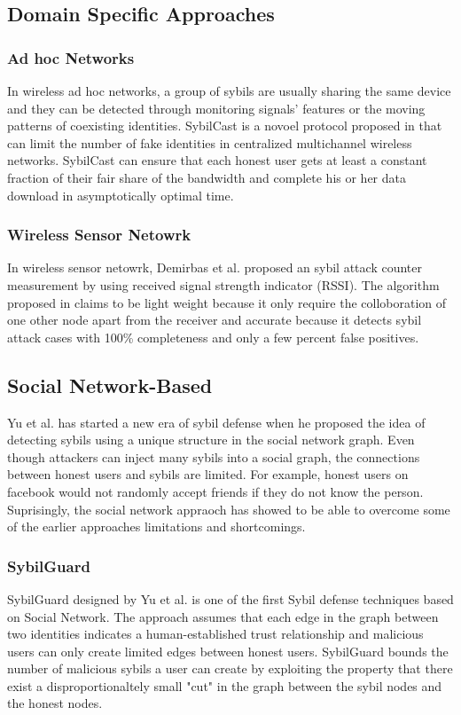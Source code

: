 \documentclass[conference]{IEEEtran}
\begin{document}
\subsection{Domain Specific Approaches}
\subsubsection{Ad hoc Networks}

In wireless ad hoc networks, a group of sybils are usually sharing the same device and they can be detected through monitoring signals’ features or the moving patterns of coexisting identities. SybilCast is a novoel protocol proposed in \cite{Zheng_thwartingsybil} that can limit the number of 
fake identities in centralized multichannel wireless networks. SybilCast can ensure that each honest user gets at least a constant fraction of their fair share of the bandwidth and complete his or her data download in asymptotically optimal time.

\subsubsection{Wireless Sensor Netowrk}
In wireless sensor netowrk, Demirbas et al. proposed an sybil attack counter measurement by using received signal strength indicator (RSSI). The algorithm proposed in \cite{Demirbas06RSSI} claims to be light weight because it only require the colloboration of one other node apart from the receiver and accurate because it detects sybil attack cases with 100\% completeness and only a few percent false positives.
\cite{Demirbas06RSSI}

\subsection{Social Network-Based}
Yu et al. has started a new era of sybil defense when he proposed the idea of detecting sybils using a unique structure in the social network graph. Even though attackers can inject many sybils into a social graph, the connections between honest users and sybils are limited\cite{Yu08SybilGuard}. For example, honest users on facebook would not randomly accept friends if they do not know the person. Suprisingly, the social network appraoch has showed to be able to overcome some of the earlier approaches limitations and shortcomings.

\subsubsection{SybilGuard}
SybilGuard designed by Yu et al. \cite{Yu08SybilGuard} is one of the first Sybil defense techniques based on Social Network. The approach assumes that each edge in the graph between two identities indicates a human-established trust relationship and malicious users can only create limited edges between honest users. SybilGuard bounds the number of malicious sybils a user can create by exploiting the property that there exist a disproportionaltely small "cut" in the 
graph between the sybil nodes and the honest nodes.
\end{document}

